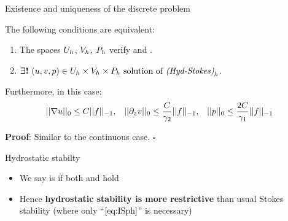 \begin{frame}{Existence and uniqueness of the discrete problem}
  \begin{theorem}
    The following conditions are equivalent:
    \begin{enumerate}
    \item The spaces $U_h$, $V_h$, $P_h$ verify \ISph and \ISvh.
    \item $\boldsymbol{\exists!} \ (u,v,p)\in
      U_h\times V_h \times P_h \ \text{solution of \ensuremath{\text{\emph{(Hyd-Stokes)}}_h}}$.
    \end{enumerate}
    \medskip
    Furthermore, in this case: \vspace{-0.8em}
  \begin{equation*}
    \begin{aligned}
      ||\nabla u||_0 \le C ||f||_{-1}, &&
      ||\partial_z v||_0  \le \frac C {\gamma_2}||f||_{-1}, &&
      ||p||_0  \le \frac{2C} {\gamma_1}||f||_{-1}
    \end{aligned}
  \end{equation*}
  \end{theorem}
  \medskip
  {\gris \textbf{Proof}: Similar to the continuous case. \hfill $\square$}
  \medskip
  \vfill
  \begin{block}{Hydrostatic stabilty}
    \begin{itemize}
    \item We say \FEthreeSpaces\Uh\Vh\Ph\xspace is  if both \ISph and \ISvh hold
    \item Hence \textbf{hydrostatic stability is more restrictive}
      than usual Stokes stability (where only ``$\ISph$''
      is necessary)
    \end{itemize}
  \end{block}
\end{frame}

